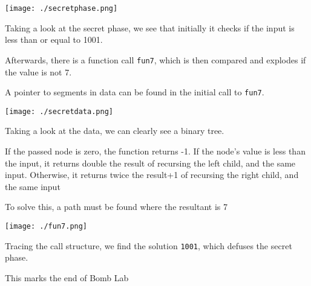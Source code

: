 \documentclass[11pt]{article}
\begin{document}
\begin{center}
\texttt{[image: ./secretphase.png]}
\end{center}

Taking a look at the secret phase, we see that initially it checks if the input is less than or equal to 1001.

Afterwards, there is a function call \texttt{fun7}, which is then compared and explodes if the value is not 7.

A pointer to segments in data can be found in the initial call to \texttt{fun7}. 

\begin{center}
\texttt{[image: ./secretdata.png]}
\end{center}

Taking a look at the data, we can clearly see a binary tree.

If the passed node is zero, the function returns -1. If the node's value is less than the input, it returns double the result of recursing the left child, and the same input. Otherwise, it returns twice the result+1 of recursing the right child, and the same input

To solve this, a path must be found where the resultant is 7

\begin{center}
\texttt{[image: ./fun7.png]}
\end{center}

Tracing the call structure, we find the solution \texttt{1001}, which defuses the secret phase.

This marks the end of Bomb Lab
\end{document}
